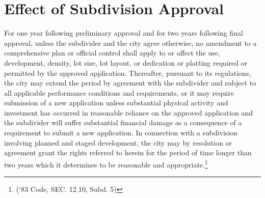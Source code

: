 \section{Effect of Subdivision Approval}
For one year following preliminary approval and for two years following final approval, unless the subdivider and the city agree otherwise, no amendment to a comprehensive plan or official control shall apply to or affect the use, development, density, lot size, lot layout, or dedication or platting required or permitted by the approved application. Thereafter, pursuant to its regulations, the city may extend the period by agreement with the subdivider and subject to all applicable performance conditions and requirements, or it may require submission of a new application unless substantial physical activity and investment has occurred in reasonable reliance on the approved application and the subdivider will suffer substantial financial damage as a consequence of a requirement to submit a new application. In connection with a subdivision involving planned and staged development, the city may by resolution or agreement grant the rights referred to herein for the period of time longer than two years which it determines to be reasonable and appropriate.\footnote{(‘83 Code, SEC. 12.10, Subd. 5)}

